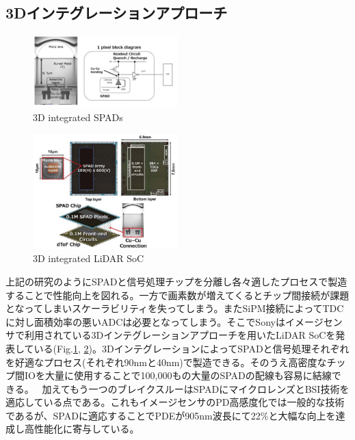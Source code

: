 \documentclass[letterpaper, 10 pt, conference]{ieeeconf}  %
\begin{document}
\subsection{3Dインテグレーションアプローチ}
\begin{figure}[!t]
\centering
 \includegraphics[width=0.5\textwidth]{figs/sonypix.png}
  \caption{3D integrated SPADs \cite{ito2020back}}
\label{sony3d}
\end{figure}

\begin{figure}[!t]
\centering
 \includegraphics[width=0.5\textwidth]{figs/sony}
  \caption{3D integrated LiDAR SoC \cite{kumagai2021189x600}}
\label{sony}
\end{figure}

上記の研究のようにSPADと信号処理チップを分離し各々適したプロセスで製造することで性能向上を図れる。一方で画素数が増えてくるとチップ間接続が課題となってしまいスケーラビリティを失ってしまう。またSiPM接続によってTDCに対し面積効率の悪いADCは必要となってしまう。そこでSonyはイメージセンサで利用されている3Dインテグレーションアプローチを用いたLiDAR SoCを発表している(Fig.\ref{sony3d}, \ref{sony})。3DインテグレーションによってSPADと信号処理それぞれを好適なプロセス(それぞれ90nmと40nm)で製造できる。そのうえ高密度なチップ間IOを大量に使用することで100,000もの大量のSPADの配線も容易に結線できる。　
加えてもう一つのブレイクスルーはSPADにマイクロレンズとBSI技術を適応している点である。これもイメージセンサのPD高感度化では一般的な技術であるが、SPADに適応することでPDEが905nm波長にて22\%と大幅な向上を達成し高性能化に寄与している。
\end{document}

